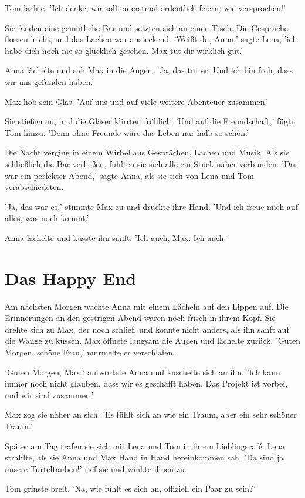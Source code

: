 \documentclass[12pt]{article}
\begin{document}
Tom lachte. 'Ich denke, wir sollten erstmal ordentlich feiern, wie versprochen!'

Sie fanden eine gemütliche Bar und setzten sich an einen Tisch. Die Gespräche flossen leicht, und das Lachen war ansteckend. 'Weißt du, Anna,' sagte Lena, 'ich habe dich noch nie so glücklich gesehen. Max tut dir wirklich gut.'

Anna lächelte und sah Max in die Augen. 'Ja, das tut er. Und ich bin froh, dass wir uns gefunden haben.'

Max hob sein Glas. 'Auf uns und auf viele weitere Abenteuer zusammen.'

Sie stießen an, und die Gläser klirrten fröhlich. 'Und auf die Freundschaft,' fügte Tom hinzu. 'Denn ohne Freunde wäre das Leben nur halb so schön.'

Die Nacht verging in einem Wirbel aus Gesprächen, Lachen und Musik. Als sie schließlich die Bar verließen, fühlten sie sich alle ein Stück näher verbunden. 'Das war ein perfekter Abend,' sagte Anna, als sie sich von Lena und Tom verabschiedeten.

'Ja, das war es,' stimmte Max zu und drückte ihre Hand. 'Und ich freue mich auf alles, was noch kommt.'

Anna lächelte und küsste ihn sanft. 'Ich auch, Max. Ich auch.'

\section{ Das Happy End }
 Am nächsten Morgen wachte Anna mit einem Lächeln auf den Lippen auf. Die Erinnerungen an den gestrigen Abend waren noch frisch in ihrem Kopf. Sie drehte sich zu Max, der noch schlief, und konnte nicht anders, als ihn sanft auf die Wange zu küssen. Max öffnete langsam die Augen und lächelte zurück. 'Guten Morgen, schöne Frau,' murmelte er verschlafen.

'Guten Morgen, Max,' antwortete Anna und kuschelte sich an ihn. 'Ich kann immer noch nicht glauben, dass wir es geschafft haben. Das Projekt ist vorbei, und wir sind zusammen.'

Max zog sie näher an sich. 'Es fühlt sich an wie ein Traum, aber ein sehr schöner Traum.'

Später am Tag trafen sie sich mit Lena und Tom in ihrem Lieblingscafé. Lena strahlte, als sie Anna und Max Hand in Hand hereinkommen sah. 'Da sind ja unsere Turteltauben!' rief sie und winkte ihnen zu.

Tom grinste breit. 'Na, wie fühlt es sich an, offiziell ein Paar zu sein?'
\end{document}
